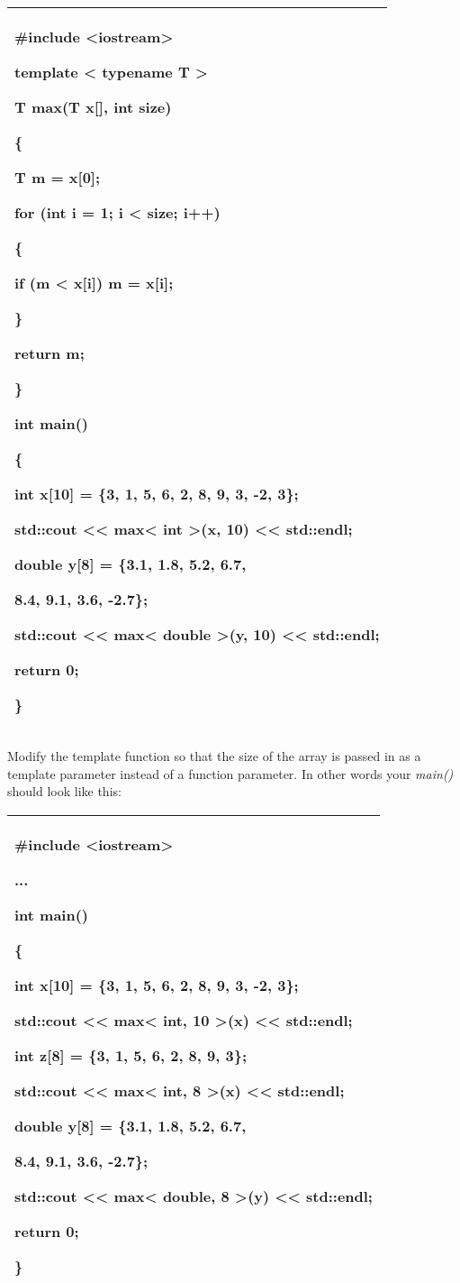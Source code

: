\documentclass[
]{article}
\begin{document}
\begin{longtable}[]{@{}l@{}}
\toprule
\endhead
\begin{minipage}[t]{0.97\columnwidth}\raggedright
\#include \textless iostream\textgreater{}

template \textless{} typename T \textgreater{}

T max(T x{[}{]}, int size)

\{

T m = x{[}0{]};

for (int i = 1; i \textless{} size; i++)

\{

if (m \textless{} x{[}i{]}) m = x{[}i{]};

\}

return m;

\}

int main()

\{

int x{[}10{]} = \{3, 1, 5, 6, 2, 8, 9, 3, -2, 3\};

std::cout \textless\textless{} max\textless{} int \textgreater(x, 10)
\textless\textless{} std::endl;

double y{[}8{]} = \{3.1, 1.8, 5.2, 6.7,

8.4, 9.1, 3.6, -2.7\};

std::cout \textless\textless{} max\textless{} double \textgreater(y, 10)
\textless\textless{} std::endl;

return 0;

\}\strut
\end{minipage}\tabularnewline
\bottomrule
\end{longtable}

Modify the template function so that the size of the array is passed in
as a template parameter instead of a function parameter. In other words
your \emph{main()} should look like this:

\begin{longtable}[]{@{}l@{}}
\toprule
\endhead
\begin{minipage}[t]{0.97\columnwidth}\raggedright
\#include \textless iostream\textgreater{}

...

int main()

\{

int x{[}10{]} = \{3, 1, 5, 6, 2, 8, 9, 3, -2, 3\};

std::cout \textless\textless{} max\textless{} int, 10 \textgreater(x)
\textless\textless{} std::endl;

int z{[}8{]} = \{3, 1, 5, 6, 2, 8, 9, 3\};

std::cout \textless\textless{} max\textless{} int, 8 \textgreater(x)
\textless\textless{} std::endl;

double y{[}8{]} = \{3.1, 1.8, 5.2, 6.7,

8.4, 9.1, 3.6, -2.7\};

std::cout \textless\textless{} max\textless{} double, 8 \textgreater(y)
\textless\textless{} std::endl;

return 0;

\}\strut
\end{minipage}\tabularnewline
\bottomrule
\end{longtable}
\end{document}
